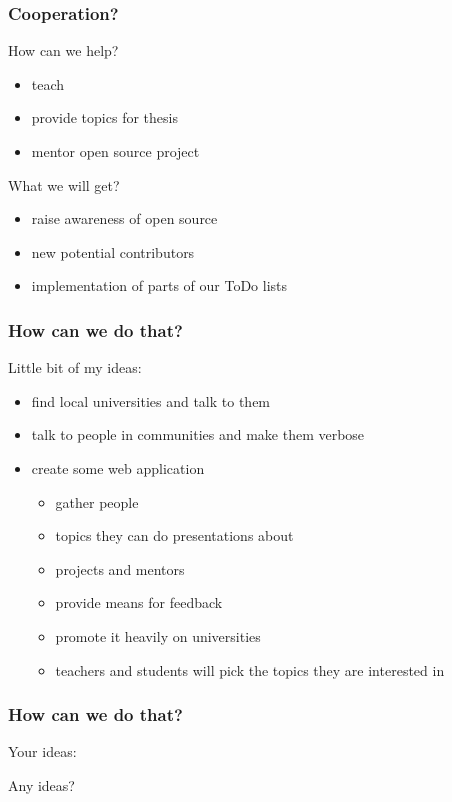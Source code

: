 \documentclass{beamer}
\begin{document}
\begin{frame}[t]
\frametitle{Cooperation?}
How can we help?
\begin{itemize}
	\item teach
	\item provide topics for thesis
	\item mentor open source project
\end{itemize}
\pause
\vspace{0.5cm}
What we will get?
\begin{itemize}
	\item raise awareness of open source
	\item new potential contributors
	\item implementation of parts of our ToDo lists
\end{itemize}
\end{frame}

\begin{frame}[t]
\frametitle{How can we do that?}
Little bit of my ideas:
\begin{itemize}
	\item find local universities and talk to them
	\item talk to people in communities and make them verbose
	\item create some web application
	\begin{itemize}
		\item gather people
		\item topics they can do presentations about
		\item projects and mentors
		\item provide means for feedback
		\item promote it heavily on universities
		\item teachers and students will pick the topics they are interested in
	\end{itemize}
\end{itemize}
\end{frame}

\begin{frame}[t]
\frametitle{How can we do that?}
Your ideas:
\vspace{2cm}
\begin{center}
{\Huge Any ideas?}
\end{center}
\end{frame}

\end{document}

